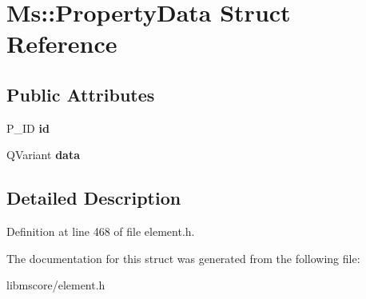 \hypertarget{struct_ms_1_1_property_data}{}\section{Ms\+:\+:Property\+Data Struct Reference}
\label{struct_ms_1_1_property_data}
\subsection*{Public Attributes}
\begin{DoxyCompactItemize}
\item 
\mbox{\label{struct_ms_1_1_property_data_af752bb599c32c10ff9446dfed1edf1b2}} 
P\+\_\+\+ID {\bfseries id}
\item 
\mbox{\label{struct_ms_1_1_property_data_a2b14fab45baef964783a0882f5dba812}} 
Q\+Variant {\bfseries data}
\end{DoxyCompactItemize}


\subsection{Detailed Description}


Definition at line 468 of file element.\+h.



The documentation for this struct was generated from the following file\+:\begin{DoxyCompactItemize}
\item 
libmscore/element.\+h\end{DoxyCompactItemize}
